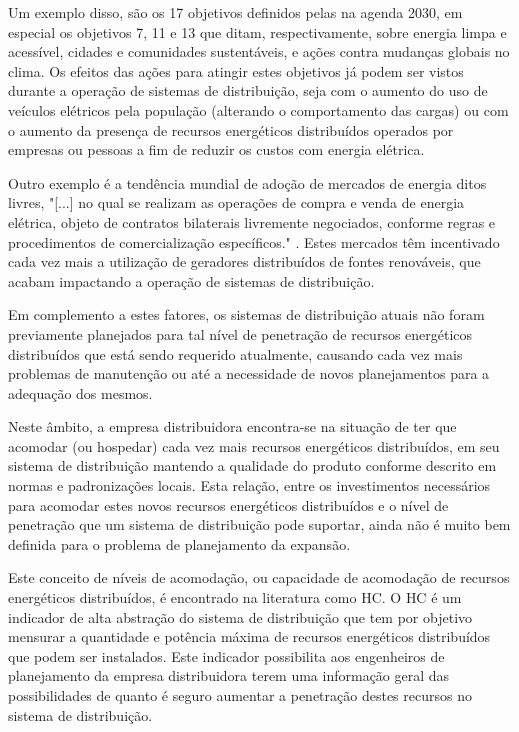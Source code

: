 Um exemplo disso, são os 17 objetivos definidos pelas  na agenda 2030, em especial os objetivos 7, 11 e 13 que ditam, respectivamente, sobre energia limpa e acessível, cidades e comunidades sustentáveis, e ações contra mudanças globais no clima. Os efeitos das ações para atingir estes objetivos já podem ser vistos durante a operação de sistemas de distribuição, seja com o aumento do uso de veículos elétricos pela população (alterando o comportamento das cargas) ou com o aumento da presença de recursos energéticos distribuídos operados por empresas ou pessoas a fim de reduzir os custos com energia elétrica.


Outro exemplo é a tendência mundial de adoção de mercados de energia ditos livres, 
"[...] no qual se realizam as operações de compra e venda de energia elétrica, objeto de contratos bilaterais livremente negociados, conforme regras e procedimentos de comercialização específicos." \cite{leimercadolivre}. Estes mercados têm incentivado cada vez mais a utilização de geradores distribuídos de fontes renováveis, que acabam impactando a operação de sistemas de distribuição.

Em complemento a estes fatores, os sistemas de distribuição atuais não foram previamente planejados para tal nível de penetração de recursos energéticos distribuídos que está sendo requerido atualmente, causando cada vez mais problemas de manutenção ou até a necessidade de novos planejamentos para a adequação dos mesmos. 

Neste âmbito, a empresa distribuidora encontra-se na situação de ter que acomodar (ou hospedar) cada vez mais recursos energéticos distribuídos, em seu sistema de distribuição mantendo a qualidade do produto conforme descrito em normas e padronizações locais. Esta relação, entre os investimentos necessários para acomodar estes novos recursos energéticos distribuídos e o nível de penetração que um sistema de distribuição pode suportar, ainda não é muito bem definida para o problema de planejamento da expansão.


Este conceito de níveis de acomodação, ou capacidade de acomodação de recursos energéticos distribuídos, é encontrado na literatura como \ac{HC}. O \ac{HC} é um indicador de alta abstração do sistema de distribuição que tem por objetivo mensurar a quantidade e potência máxima de recursos energéticos distribuídos que podem ser instalados. Este indicador possibilita aos engenheiros de planejamento da empresa distribuidora terem uma informação geral das possibilidades de quanto é seguro aumentar a penetração destes recursos no sistema de distribuição.

